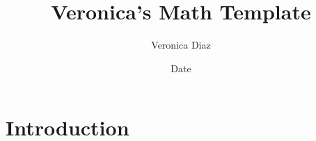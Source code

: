 \documentclass{article}
\title{Veronica's Math Template}
\author{Veronica Diaz}
\date{Date}
\begin{document}
\theoremstyle{definition}
\theoremstyle{theorem}
\newtheorem{theorem}{theorem}
\newtheorem{definition}{definition}

\maketitle

\section{Introduction}
\end{document}
